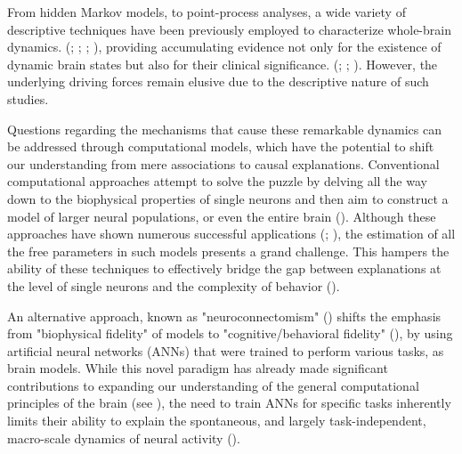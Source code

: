 \documentclass{article}
\begin{document}
From hidden Markov models, to point-process analyses, a wide variety of descriptive techniques have been previously employed to characterize whole-brain dynamics. (\href{https://doi.org/10.1073/pnas.1121329109}{}; \href{https://doi.org/10.1073/pnas.1705120114}{}; \href{https://doi.org/10.1073/pnas.1216856110}{}; \href{https://doi.org/10.1089/brain.2018.0586}{}), providing accumulating evidence not only for the existence of dynamic brain states but also for their clinical significance. (\href{https://doi.org/10.1016/j.neuroimage.2013.05.079}{}; \href{https://doi.org/10.1073/pnas.1418031112}{}; \href{https://doi.org/10.1038/s41467-020-18717-w}{}).
However, the underlying driving forces remain elusive due to the descriptive nature of such studies.


Questions regarding the mechanisms that cause these remarkable dynamics can be addressed through computational models, which have the potential to shift our understanding from mere associations to causal explanations.
Conventional computational approaches attempt to solve the puzzle by delving all the way down to the biophysical properties of single neurons and then aim to construct a model of larger neural populations, or even the entire brain (\href{https://doi.org/10.1038/nn.4497}{}).
Although these approaches have shown numerous successful applications  (\href{https://doi.org/10.1038/s41593-018-0210-5}{}; \href{https://doi.org/10.1093/schbul/sby154}{}), the estimation of all the free parameters in such models presents a grand challenge.
This hampers the ability of these techniques to effectively bridge the gap between explanations at the level of single neurons and the complexity of behavior (\href{https://doi.org/10.1038/nn.4497}{}).

An alternative approach, known as "neuroconnectomism" (\href{https://doi.org/10.1038/s41583-023-00705-w}{}) shifts the emphasis from "biophysical fidelity" of models to "cognitive/behavioral fidelity" (\href{https://doi.org/10.1038/s41593-018-0210-5}{}), by using artificial neural networks (ANNs) that were trained to perform various tasks, as brain models.
While this novel paradigm has already made significant contributions to expanding our understanding of the general computational principles of the brain (see \href{https://doi.org/10.1038/s41583-023-00705-w}{}), the need to train ANNs for specific tasks inherently limits their ability to explain the spontaneous, and largely task-independent, macro-scale dynamics of neural activity  (\href{https://doi.org/10.1038/s41593-019-0520-2}{}).
\end{document}
